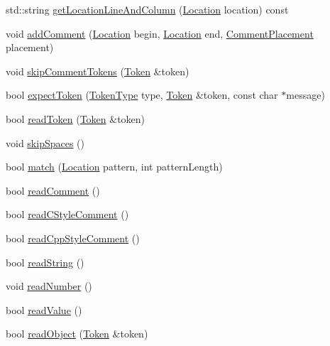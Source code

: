 \begin{DoxyCompactItemize}
\item 
std\-::string \hyperlink{classJson_1_1Reader_ac5b4b5a76d3224871519b0656393b35b}{get\-Location\-Line\-And\-Column} (\hyperlink{classJson_1_1Reader_a46795b5b272bf79a7730e406cb96375a}{Location} location) const 
\item 
void \hyperlink{classJson_1_1Reader_aaea3bd62d12ffb6117a61476c0685049}{add\-Comment} (\hyperlink{classJson_1_1Reader_a46795b5b272bf79a7730e406cb96375a}{Location} begin, \hyperlink{classJson_1_1Reader_a46795b5b272bf79a7730e406cb96375a}{Location} end, \hyperlink{namespaceJson_a4fc417c23905b2ae9e2c47d197a45351}{Comment\-Placement} placement)
\item 
void \hyperlink{classJson_1_1Reader_a22e677ef400d8223f27e631b4cd4b821}{skip\-Comment\-Tokens} (\hyperlink{classJson_1_1Reader_1_1Token}{Token} \&token)
\item 
bool \hyperlink{classJson_1_1Reader_a442d779d60825634625040eed83eadc5}{expect\-Token} (\hyperlink{classJson_1_1Reader_aa35e6ab574dc399a0a645ad98ed66bc9}{Token\-Type} type, \hyperlink{classJson_1_1Reader_1_1Token}{Token} \&token, const char $\ast$message)
\item 
bool \hyperlink{classJson_1_1Reader_a7cb0631963cc0fd4ff6ed0f570976864}{read\-Token} (\hyperlink{classJson_1_1Reader_1_1Token}{Token} \&token)
\item 
void \hyperlink{classJson_1_1Reader_a40d0f69d15aeb2d52ff78d794f5ab8b2}{skip\-Spaces} ()
\item 
bool \hyperlink{classJson_1_1Reader_a3e5a7bc6b7b53f2ca8cb9da42f8ffb21}{match} (\hyperlink{classJson_1_1Reader_a46795b5b272bf79a7730e406cb96375a}{Location} pattern, int pattern\-Length)
\item 
bool \hyperlink{classJson_1_1Reader_ad2690e860a1b3332c5401fb0850ba065}{read\-Comment} ()
\item 
bool \hyperlink{classJson_1_1Reader_ae0ffe796abdc3c5851589ee500e28c79}{read\-C\-Style\-Comment} ()
\item 
bool \hyperlink{classJson_1_1Reader_a6716ef6290b0f469efaf8d379c357967}{read\-Cpp\-Style\-Comment} ()
\item 
bool \hyperlink{classJson_1_1Reader_a6328a0b1994e05118886f9fc9c608643}{read\-String} ()
\item 
void \hyperlink{classJson_1_1Reader_afb31bfda6bb27d6453057a47655e8363}{read\-Number} ()
\item 
bool \hyperlink{classJson_1_1Reader_a47e56844b803d41ec993a83fadf4495c}{read\-Value} ()
\item 
bool \hyperlink{classJson_1_1Reader_a0068eb3d8e86e91f0e4806f60da66b9c}{read\-Object} (\hyperlink{classJson_1_1Reader_1_1Token}{Token} \&token)

\end{DoxyCompactItemize}
